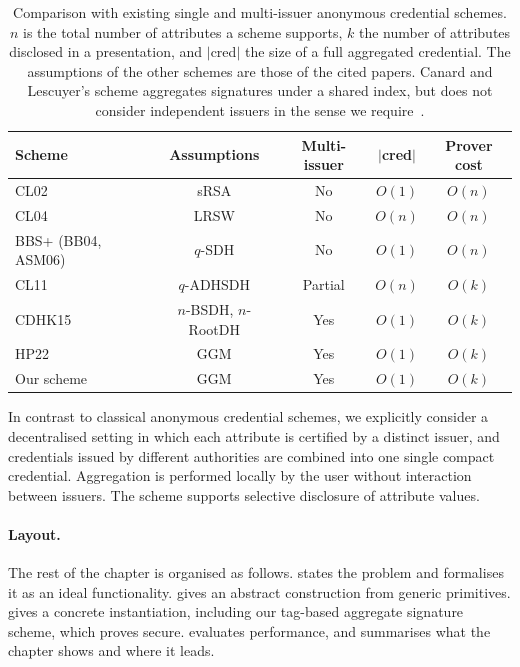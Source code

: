 \begin{table}[htbp] \centering
  \begin{tabular}{l|c|c|c|c}
    \toprule Scheme & Assumptions & Multi-issuer & $|$cred$|$ & Prover cost \\ \midrule
    CL02~\cite{SCN:CamLys02} & sRSA & No & $O(1)$ & $O(n)$ \\
    CL04~\cite{C:CamLys04} & LRSW & No & $O(n)$ & $O(n)$ \\
    BBS+ (BB04, ASM06)~\cite{EC:BonBoy04a,SCN:AuSusMu06} & $q$-SDH & No & $O(1)$ & $O(n)$ \\
    CL11~\cite{canard2011anonymous} & $q$-ADHSDH & Partial & $O(n)$ & $O(k)$ \\
    CDHK15~\cite{AC:CDHK15} & $n$-BSDH, $n$-RootDH & Yes & $O(1)$ & $O(k)$ \\
    HP22~\cite{SCN:HebPoi22} & GGM & Yes & $O(1)$ & $O(k)$ \\
    Our scheme & GGM & Yes & $O(1)$ & $O(k)$ \\
\bottomrule
  \end{tabular}
  \caption[Comparison with existing anonymous credential schemes]{Comparison with
existing single and multi-issuer anonymous credential schemes. $n$ is the total
number of attributes a scheme supports, $k$ the number of attributes disclosed in
a presentation, and $|$cred$|$ the size of a full aggregated credential. The
assumptions of the other schemes are those of the cited papers. Canard and
Lescuyer's scheme aggregates signatures under a shared index, but does not
consider independent issuers in the sense we
require~\cite{canard2011anonymous}.} \label{tab:agg-creds-related} \end{table}

In contrast to classical anonymous credential
schemes, we explicitly consider a decentralised setting in which each attribute
is certified by a distinct issuer, and credentials issued by different
authorities are combined into one single compact credential.  Aggregation is
performed locally by the user without interaction between issuers. The scheme
supports selective disclosure of attribute values.

\paragraph{Layout.} The rest of the chapter is organised as follows.  states the problem and
formalises it as an ideal functionality.  
gives an abstract construction from generic primitives.
 gives a concrete instantiation, including our
tag-based aggregate signature scheme, which  proves
secure.   evaluates performance, and
 summarises what the chapter shows and where it leads.
